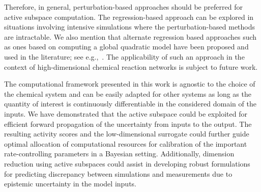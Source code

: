 %
Therefore, in general, perturbation-based approaches should be preferred for 
active subspace computation.
The regression-based approach can be explored in situations involving intensive
simulations where the perturbation-based methods are intractable.
%
%
We also mention that alternate regression based approaches such as ones based
on computing a global quadratic model have been proposed and used in the
literature; see e.g.,~\cite{Constantine:2017a}.  The applicability of such an
approach in the context of high-dimensional chemical reaction networks is
subject to future work. 

The computational framework presented in this work is agnostic to the choice of
the chemical system and can be easily adapted for other systems as long
as the quantity of interest is continuously differentiable in the considered
domain of the inputs.  We have demonstrated that the active subspace could be
exploited for efficient forward propagation of the uncertainty from inputs to
the output. The resulting activity scores and the low-dimensional surrogate
could further guide optimal allocation of computational resources for
calibration of the important rate-controlling parameters in a Bayesian setting.
Additionally, dimension reduction using active subspaces could assist in
developing robust formulations for predicting discrepancy between simulations
and measurements due to epistemic uncertainty in the model inputs.
